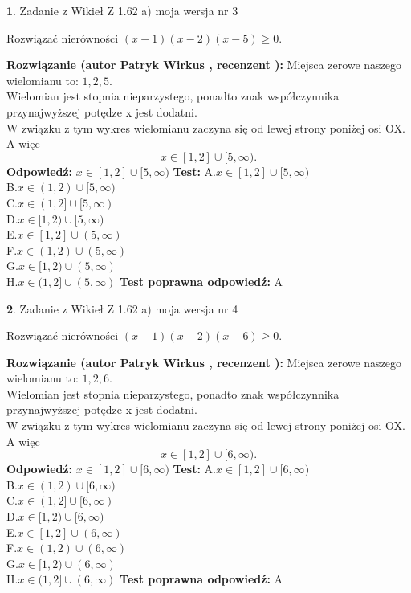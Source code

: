 \documentclass[12pt, a4paper]{article}
\theoremstyle{definition} %
\newtheorem{zad}{}
\newcommand{\zadStart}[1]{\begin{zad}#1\newline}
\newcommand{\zadStop}{\end{zad}}
\newcommand{\rozwStart}[2]{\noindent \textbf{Rozwiązanie (autor #1 , recenzent #2): }\newline}
\newcommand{\rozwStop}{\newline}
\newcommand{\odpStart}{\noindent \textbf{Odpowiedź:}\newline}
\newcommand{\odpStop}{\newline}
\newcommand{\testStart}{\noindent \textbf{Test:}\newline}
\newcommand{\testStop}{\newline}
\newcommand{\kluczStart}{\noindent \textbf{Test poprawna odpowiedź:}\newline}
\newcommand{\kluczStop}{\newline}
\begin{document}
\zadStart{Zadanie z Wikieł Z 1.62 a) moja wersja nr 3}

Rozwiązać nierówności $(x-1)(x-2)(x-5)\ge0$.
\zadStop
\rozwStart{Patryk Wirkus}{}
Miejsca zerowe naszego wielomianu to: $1, 2, 5$.\\
Wielomian jest stopnia nieparzystego, ponadto znak współczynnika przy\linebreak najwyższej potędze x jest dodatni.\\ W związku z tym wykres wielomianu zaczyna się od lewej strony poniżej osi OX. A więc $$x \in [1,2] \cup [5,\infty).$$
\rozwStop
\odpStart
$x \in [1,2] \cup [5,\infty)$
\odpStop
\testStart
A.$x \in [1,2] \cup [5,\infty)$\\
B.$x \in (1,2) \cup [5,\infty)$\\
C.$x \in (1,2] \cup [5,\infty)$\\
D.$x \in [1,2) \cup [5,\infty)$\\
E.$x \in [1,2] \cup (5,\infty)$\\
F.$x \in (1,2) \cup (5,\infty)$\\
G.$x \in [1,2) \cup (5,\infty)$\\
H.$x \in (1,2] \cup (5,\infty)$
\testStop
\kluczStart
A
\kluczStop



\zadStart{Zadanie z Wikieł Z 1.62 a) moja wersja nr 4}

Rozwiązać nierówności $(x-1)(x-2)(x-6)\ge0$.
\zadStop
\rozwStart{Patryk Wirkus}{}
Miejsca zerowe naszego wielomianu to: $1, 2, 6$.\\
Wielomian jest stopnia nieparzystego, ponadto znak współczynnika przy\linebreak najwyższej potędze x jest dodatni.\\ W związku z tym wykres wielomianu zaczyna się od lewej strony poniżej osi OX. A więc $$x \in [1,2] \cup [6,\infty).$$
\rozwStop
\odpStart
$x \in [1,2] \cup [6,\infty)$
\odpStop
\testStart
A.$x \in [1,2] \cup [6,\infty)$\\
B.$x \in (1,2) \cup [6,\infty)$\\
C.$x \in (1,2] \cup [6,\infty)$\\
D.$x \in [1,2) \cup [6,\infty)$\\
E.$x \in [1,2] \cup (6,\infty)$\\
F.$x \in (1,2) \cup (6,\infty)$\\
G.$x \in [1,2) \cup (6,\infty)$\\
H.$x \in (1,2] \cup (6,\infty)$
\testStop
\kluczStart
A
\kluczStop
\end{document}

